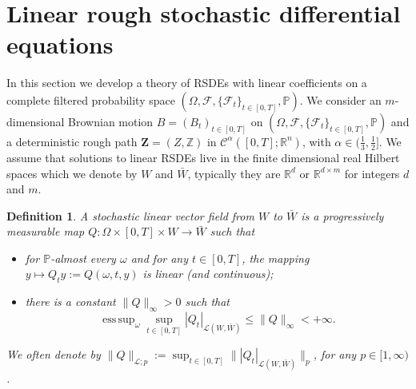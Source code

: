 \documentclass[11pt,a4paper]{article}
\newcommand{\R}{\mathbb{R}}
\newcommand{\esssup}{\mathop{\mathrm{ess\,sup}}}
\newtheorem{defn}{Definition}[section]
\theoremstyle{plain}
\newtheorem{rmk}[defn]{Remark}
\begin{document}



\section{Linear rough stochastic differential equations}
\label{sec: linear rough stochastic equations}
In this section we develop a theory of RSDEs with linear coefficients on a complete filtered probability space $(\Omega,\mathcal{F},\{\mathcal{F}_t\}_{t \in [0,T]}, \mathbb{P})$. We consider an $m$-dimensional Brownian motion $B=(B_t)_{t \in [0,T]}$ on $(\Omega,\mathcal{F},\{\mathcal{F}_t\}_{t \in [0,T]}, \mathbb{P})$ and a deterministic rough path $\mathbf{Z}=(Z,\mathbb{Z})$ in $\mathscr{C}^{\alpha}([0,T];\R^n)$, with $\alpha \in (\frac{1}{3},\frac{1}{2}]$. We assume that solutions to linear RSDEs live in the finite dimensional real Hilbert spaces which we denote by $W$ and $\bar{W}$, typically they are $\R^d$ or $\R^{d\times m}$ for integers $d$ and $m$.

\begin{defn}\label{def:stochasticlinearvectorfields}
A stochastic linear vector field from $W$ to $\bar{W}$ is a progressively measurable map $Q:\Omega \times [0,T] \times W \to \bar{W}$ such that \begin{itemize}
    \item for $\mathbb{P}$-almost every $\omega$ and for any $t \in [0,T]$, the mapping $y \mapsto Q_t y := Q(\omega,t,y)$ is linear (and continuous);
    \item there is a constant $\|Q\|_{\infty} >0$ such that \begin{equation*}
       \esssup_{\omega} \sup_{t \in [0,T]} | Q_t |_{\mathscr{L}(W,\bar{W})} \le \|Q\|_\infty <+ \infty.  \end{equation*}
\end{itemize} 
We often denote by $\|Q\|_{\mathscr{L};p} := \sup_{t \in [0,T]} \| | Q_t |_{\mathscr{L}(W,\bar{W})} \|_p$, for any $p \in [1,\infty)$.
\end{defn}
\end{document}
